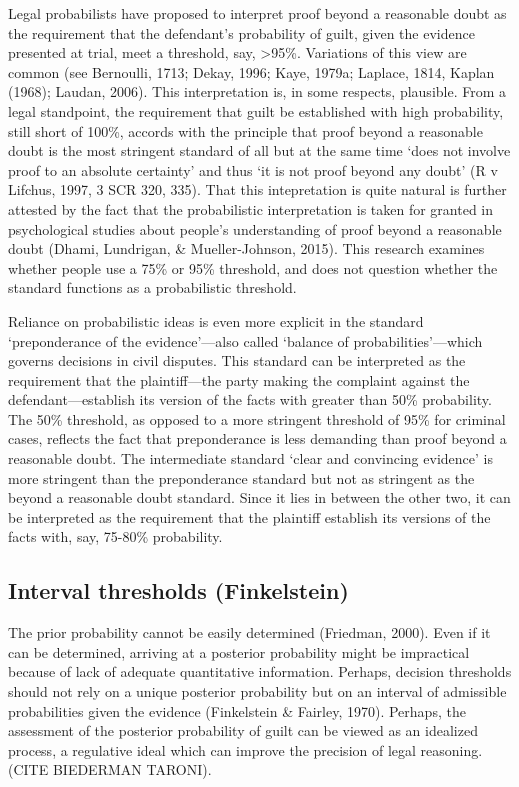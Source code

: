 \documentclass[10pt,dvipsnames]{scrartcl}
\begin{document}
Legal probabilists have proposed to interpret proof beyond a reasonable
doubt as the requirement that the defendant's probability of guilt,
given the evidence presented at trial, meet a threshold, say,
\textgreater{}95\%. Variations of this view are common (see Bernoulli,
1713; Dekay, 1996; Kaye, 1979a; Laplace, 1814, Kaplan (1968); Laudan,
2006). This interpretation is, in some respects, plausible. From a legal
standpoint, the requirement that guilt be established with high
probability, still short of 100\%, accords with the principle that proof
beyond a reasonable doubt is the most stringent standard of all but at
the same time `does not involve proof to an absolute certainty' and thus
`it is not proof beyond any doubt' (R v Lifchus, 1997, 3 SCR 320, 335).
That this intepretation is quite natural is further attested by the fact
that the probabilistic interpretation is taken for granted in
psychological studies about people's understanding of proof beyond a
reasonable doubt (Dhami, Lundrigan, \& Mueller-Johnson, 2015). This
research examines whether people use a 75\% or 95\% threshold, and does
not question whether the standard functions as a probabilistic
threshold.

Reliance on probabilistic ideas is even more explicit in the standard
`preponderance of the evidence'---also called `balance of
probabilities'---which governs decisions in civil disputes. This
standard can be interpreted as the requirement that the plaintiff---the
party making the complaint against the defendant---establish its version
of the facts with greater than 50\% probability. The 50\% threshold, as
opposed to a more stringent threshold of 95\% for criminal cases,
reflects the fact that preponderance is less demanding than proof beyond
a reasonable doubt. The intermediate standard `clear and convincing
evidence' is more stringent than the preponderance standard but not as
stringent as the beyond a reasonable doubt standard. Since it lies in
between the other two, it can be interpreted as the requirement that the
plaintiff establish its versions of the facts with, say, 75-80\%
probability.

\subsection{Interval thresholds
(Finkelstein)}\label{interval-thresholds-finkelstein}

The prior probability cannot be easily determined (Friedman, 2000). Even
if it can be determined, arriving at a posterior probability might be
impractical because of lack of adequate quantitative information.
Perhaps, decision thresholds should not rely on a unique posterior
probability but on an interval of admissible probabilities given the
evidence (Finkelstein \& Fairley, 1970). Perhaps, the assessment of the
posterior probability of guilt can be viewed as an idealized process, a
regulative ideal which can improve the precision of legal reasoning.
(CITE BIEDERMAN TARONI).
\end{document}
